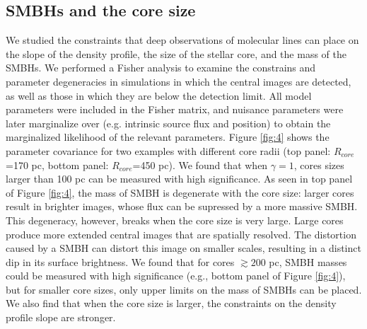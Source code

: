 \documentclass[chicago]{emulateapj}
\begin{document}
\subsection{SMBHs and the core size}
We studied the constraints that deep observations of molecular lines can place on the slope of the density profile, the size of the stellar core, and the mass of the SMBHs. 
We performed a Fisher analysis to examine the constrains and parameter degeneracies in simulations in which the central images are detected, as well as those in which they are below the detection limit. All model parameters were included in the Fisher matrix, and nuisance parameters were later marginalize over (e.g. intrinsic source flux and position) to obtain the marginalized likelihood of the relevant parameters.  
 Figure \ref{fig:4} shows the parameter covariance for two examples with different core radii (top panel:  $R_{core}$=170 pc, bottom panel: $R_{core}$=450 pc).
We found that when $\gamma=1$, cores sizes larger than 100 pc can be measured with high significance. As seen in top panel of Figure \ref{fig:4}, 
the mass of SMBH is degenerate with the core size: larger cores result in brighter images, whose flux can be supressed by a more massive SMBH.
This degeneracy,  however,  breaks when the core size is very large. 
Large cores produce more extended central images that are spatially resolved. The distortion caused by a SMBH can distort this image on smaller scales, resulting in a distinct dip in its surface brightness. %
We found that for cores $\gtrsim200$ pc, SMBH masses could be measured with high significance (e.g., bottom panel of Figure \ref{fig:4}), but for smaller core sizes, only upper limits on the mass of SMBHs can be placed.
We also find that when the core size is larger, the constraints on the density profile slope are stronger.

\end{document}
